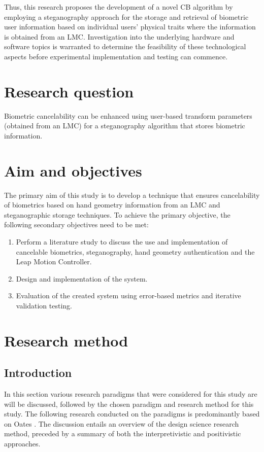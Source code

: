 Thus, this research proposes the development of a novel CB algorithm by employing a steganography approach for the storage and retrieval of biometric user information based on individual users’ physical traits where the information is obtained from an LMC. Investigation into the underlying hardware and software topics is warranted to determine the feasibility of these technological aspects before experimental implementation and testing can commence.


\section{Research question}  %
\label{section1.3}

Biometric cancelability can be enhanced using user-based transform parameters (obtained from an LMC) for a steganography algorithm that stores biometric information.


\section{Aim and objectives}  %
\label{section1.4}
The primary aim of this study is to develop a technique that ensures cancelability of biometrics based on hand geometry information from an LMC and steganographic storage techniques.
To achieve the primary objective, the following secondary objectives need to be met:

\begin{enumerate}[label=\roman*.]
\item Perform a literature study to discuss the use and implementation of cancelable biometrics, steganography, hand geometry authentication and the Leap Motion Controller.
\item Design and implementation of the system.
\item Evaluation of the created system using error-based metrics and iterative validation testing.
\end{enumerate}

\section{Research method}  %
\subsection{Introduction}
In this section various research paradigms that were considered for this study are will be discussed, followed by the chosen paradigm and research method for this study. The following research conducted on the paradigms is predominantly based on Oates \cite{OatesJ2006}. The discussion entails an overview of the design science research method, preceded by a summary of both the interpretivistic and positivistic approaches.

